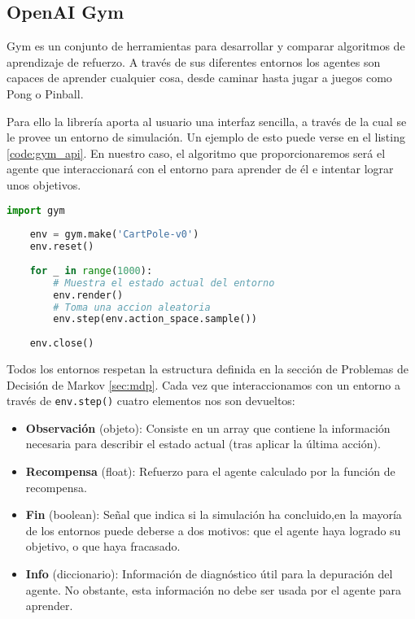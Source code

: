 \subsection{OpenAI Gym}
\label{sec:openai}
Gym es un conjunto de herramientas para desarrollar y comparar algoritmos de aprendizaje de refuerzo. A través de sus diferentes entornos los agentes son capaces de aprender cualquier cosa, desde caminar hasta jugar a juegos como Pong o Pinball.

Para ello la librería aporta al usuario una interfaz sencilla, a través de la cual se le provee un entorno de simulación. Un ejemplo de esto puede verse en el listing \ref{code:gym_api}. En nuestro caso, el algoritmo que proporcionaremos será el agente que interaccionará con el entorno para aprender de él e intentar lograr unos objetivos.

\begin{minipage}{0.9\linewidth}%
    \begin{lstlisting}[frame=tb, language=Python, caption=Creación y renderizado del entorno CartPole, label=code:gym_api]
    import gym
    
    env = gym.make('CartPole-v0')
    env.reset()
    
    for _ in range(1000):
        # Muestra el estado actual del entorno
        env.render()
        # Toma una accion aleatoria
        env.step(env.action_space.sample())
    
    env.close()
    \end{lstlisting}%
\end{minipage}

Todos los entornos respetan la estructura definida en la sección de Problemas de Decisión de Markov \ref{sec:mdp}. Cada vez que interaccionamos con un entorno a través de \texttt{env.step()} cuatro elementos nos son devueltos:
\begin{itemize}
    \item \textbf{Observación} (objeto): Consiste en un array que contiene la información necesaria para describir el estado actual (tras aplicar la última acción).
    \item \textbf{Recompensa} (float): Refuerzo para el agente calculado por la función de recompensa.
    \item \textbf{Fin} (boolean): Señal que indica si la simulación ha concluido,en la mayoría de los entornos puede deberse a dos motivos: que el agente haya logrado su objetivo, o que haya fracasado.
    \item \textbf{Info} (diccionario): Información de diagnóstico útil para la depuración del agente. No obstante, esta información no debe ser usada por el agente para aprender.
\end{itemize}

